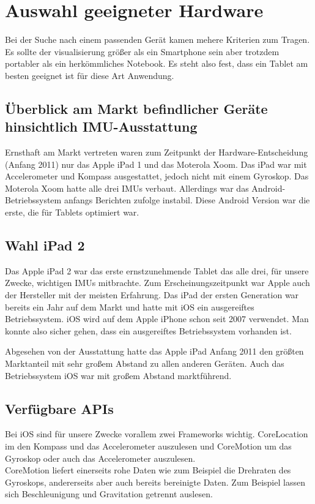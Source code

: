 
\chapter{Auswahl geeigneter Hardware}
  \label{Auswahl geeigneter Hardware}
  
  \medskip
  Bei der Suche nach einem passenden Gerät kamen mehere Kriterien zum Tragen. Es sollte der visualisierung größer als ein Smartphone sein aber trotzdem portabler als ein herkömmliches Notebook. Es steht also fest, dass ein Tablet am besten geeignet ist für diese Art Anwendung.

	\section{Überblick am Markt befindlicher Geräte hinsichtlich IMU-Ausstattung}
	Ernsthaft am Markt vertreten waren zum Zeitpunkt der Hardware-Entscheidung (Anfang 2011) nur das Apple iPad 1 und das Moterola Xoom. Das iPad war mit Accelerometer und Kompass ausgestattet, jedoch nicht mit einem Gyroskop. Das Moterola Xoom hatte alle drei IMUs verbaut. Allerdings war das Android-Betriebssystem anfangs Berichten zufolge instabil. Diese Android Version war die erste, die für Tablets optimiert war. 
	
	\section{Wahl iPad 2}
	Das Apple iPad 2 war das erste ernstzunehmende Tablet das alle drei, für unsere Zwecke, wichtigen IMUs mitbrachte. Zum Erscheinungszeitpunkt war Apple auch der Hersteller mit der meisten Erfahrung. Das iPad der ersten Generation war bereits ein Jahr auf dem Markt und hatte mit iOS ein ausgereiftes Betriebssystem. iOS wird auf dem Apple iPhone schon seit 2007 verwendet. Man konnte also sicher gehen, dass ein ausgereiftes Betriebssystem vorhanden ist.

	Abgesehen von der Ausstattung hatte das Apple iPad Anfang 2011 den größten Marktanteil mit sehr großem Abstand zu allen anderen Geräten. Auch das Betriebssystem iOS war mit großem Abstand marktführend.
	
	\section{Verfügbare APIs}
	Bei iOS sind für unsere Zwecke vorallem zwei Frameworks wichtig. CoreLocation im den Kompass und das Accelerometer auszulesen und CoreMotion um das Gyroskop oder auch das Accelerometer auszulesen.\\

CoreMotion liefert einerseits rohe Daten wie zum Beispiel die Drehraten des Gyroskops, andererseits aber auch bereits bereinigte Daten. Zum Beispiel lassen sich Beschleunigung und Gravitation getrennt auslesen.